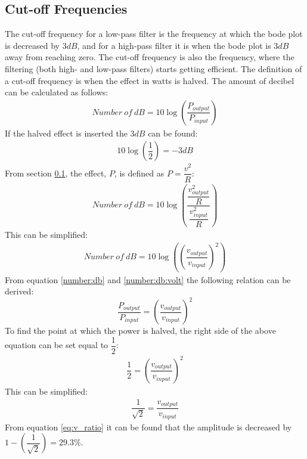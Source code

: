 \subsection{Cut-off Frequencies}
The cut-off frequency for a low-pass filter is the frequency at which the bode plot is decreased by $3dB$, and for a high-pass filter it is when the bode plot is $3dB$ away from reaching zero. The cut-off frequency is also the frequency, where the filtering (both high- and low-pass filters) starts getting efficient. The definition of a cut-off frequency is when the effect in watts is halved. The amount of decibel can be calculated as follows: \cite[p. 596-597]{bcircuit}
\begin{align} \label{number:db}
Number \ of \ dB = 10 \log \left(\dfrac{P_{output}}{P_{input}} \right)
\end{align}
If the halved effect is inserted the $3dB$ can be found:
\begin{align*} 
10 \log \left(\dfrac{1}{2} \right) = -3 dB
\end{align*}
From section \ref{}, the effect, $P$, is defined as $P=\dfrac{v^2}{R}$:
\begin{align*}
Number \ of \ dB = 10 \log \left(\dfrac{\dfrac{v_{output}^2}{R}}{\dfrac{v_{input}^2}{R}} \right)
\end{align*}
This can be simplified:
\begin{align} \label{number:db:volt}
Number \ of \ dB = 10 \log \left(\left(\dfrac{v_{output}}{v_{input}} \right)^2\right)
\end{align}
From equation \eqref{number:db} and \eqref{number:db:volt} the following relation can be derived: $$\dfrac{P_{output}}{P_{input}}= \left(\dfrac{v_{output}}{v_{input}} \right)^2$$ To find the point at which the power is halved, the right side of the above equation can be set equal to $\dfrac{1}{2}$:
\begin{align*}
\dfrac{1}{2}= \left(\dfrac{v_{output}}{v_{input}} \right)^2
\end{align*}
This can be simplified:
\begin{align} \label{eq:v_ratio}
\dfrac{1}{\sqrt{2}}= \dfrac{v_{output}}{v_{input}}
\end{align}
From equation \eqref{eq:v_ratio} it can be found that the amplitude is decreased by $1-\left(\dfrac{1}{\sqrt{2}} \right) = 29.3\%$.

